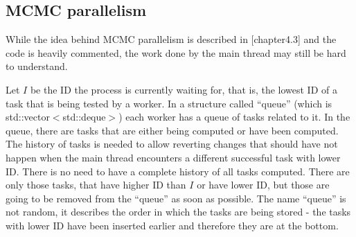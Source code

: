 \subsection{MCMC parallelism}
While the idea behind MCMC parallelism is described in [chapter4.3] and the code is heavily commented, the work done by the main thread may still be hard to understand.

Let $I$ be the ID the process is currently waiting for, that is, the lowest ID of a task that is being tested by a worker. In a structure called ``queue'' (which is std::vector$<$std::deque$>$) each worker has a queue of tasks related to it. In the queue, there are tasks that are either being computed or have been computed. The history of tasks is needed to allow reverting changes that should have not happen when the main thread encounters a different successful task with lower ID. There is no need to have a complete history of all tasks computed. There are only those tasks, that have higher ID than $I$ or have lower ID, but those are going to be removed from the ``queue'' as soon as possible. The name ``queue'' is not random, it describes the order in which the tasks are being stored - the tasks with lower ID have been inserted earlier and therefore they are at the bottom.

